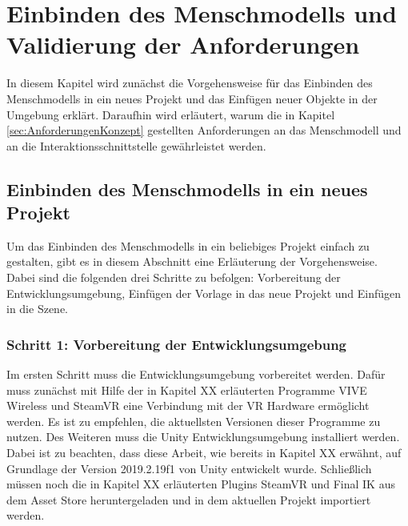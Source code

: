 \chapter{Einbinden des Menschmodells und Validierung der Anforderungen}\label{cha:ValidierungDesKonzepts}
In diesem Kapitel wird zunächst die Vorgehensweise für das Einbinden des Menschmodells in ein neues Projekt und das Einfügen neuer Objekte in der Umgebung erklärt. Daraufhin wird erläutert, warum die in Kapitel \ref{sec:AnforderungenKonzept} gestellten Anforderungen an das Menschmodell und an die Interaktionsschnittstelle gewährleistet werden.

\section{Einbinden des Menschmodells in ein neues Projekt}\label{sec:MenschmodellEinbinden}
Um das Einbinden des Menschmodells in ein beliebiges Projekt einfach zu gestalten, gibt es in diesem Abschnitt eine Erläuterung der Vorgehensweise. Dabei sind die folgenden drei Schritte zu befolgen: Vorbereitung der Entwicklungsumgebung, Einfügen der Vorlage in das neue Projekt und Einfügen in die Szene.

\subsection{Schritt 1: Vorbereitung der Entwicklungsumgebung}
Im ersten Schritt muss die Entwicklungsumgebung vorbereitet werden. Dafür muss zunächst mit Hilfe der in Kapitel XX erläuterten Programme VIVE Wireless und SteamVR eine Verbindung mit der VR Hardware ermöglicht werden. Es ist zu empfehlen, die aktuellsten Versionen dieser Programme zu nutzen. Des Weiteren muss die Unity Entwicklungsumgebung installiert werden. Dabei ist zu beachten, dass diese Arbeit, wie bereits in Kapitel XX erwähnt, auf Grundlage der Version 2019.2.19f1 von Unity entwickelt wurde. Schließlich müssen noch die in Kapitel XX erläuterten Plugins SteamVR und Final IK aus dem Asset Store heruntergeladen und in dem aktuellen Projekt importiert werden.

